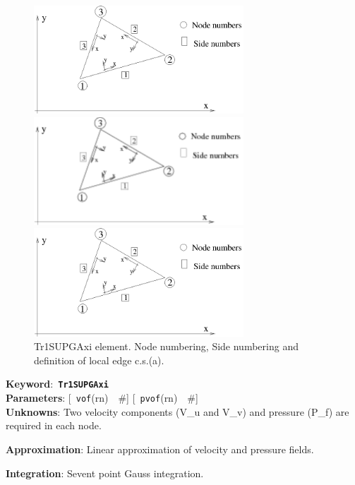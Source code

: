 \documentclass[a4paper]{article}
\newcommand{\descitem}[1]{{\noindent \bf #1}:}
\newcommand{\elemkeyword}[1]{\descitem{Keyword}~{\bf \texttt{#1}}}
\newcommand{\elemparam}[2]{{{\texttt{#1}\tiny (#2)}~~\#}}
\newcommand{\optelemparam}[2]{{[~\elemparam{#1}{#2}]}}
\begin{document}
\begin{figure}[tb]
\begin{htmlonly}
  \centerline{\includegraphics[width=0.7\textwidth]{trplanstrss.eps}}
\end{htmlonly}
\ifpdf
 \centerline{\includegraphics[width=0.7\textwidth]{trplanstrss.pdf}}
\else
 \centerline{\includegraphics[width=0.7\textwidth]{trplanstrss.eps}}
\fi
\caption{Tr1SUPGAxi element. Node numbering, Side numbering and
definition of local edge c.s.(a).}
\label{Tr1SUPGAxifig}
\end{figure}

\elemkeyword{Tr1SUPGAxi}\\
\descitem{Parameters} \optelemparam{vof}{rn}
\optelemparam{pvof}{rn}\\
\descitem{Unknowns}
Two velocity components (V\_u and V\_v) and pressure (P\_f) are required in each node.

\descitem{Approximation} Linear approximation of velocity and pressure
fields.

\descitem{Integration}
Sevent point Gauss integration.
\end{document}
